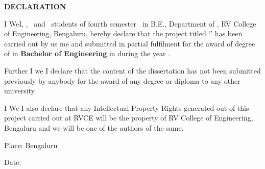 
\thispagestyle{empty}

\begin{center}
\Large\textbf{\underline{DECLARATION}} \par
\end{center}


\noindent \ifPG I \else \ifStuNameBUsed We\else I\fi\fi, \textbf{\printStuNameA} \ifPG \else\ifStuNameBUsed , \textbf{\printStuNameB}$\,$ \ifStuNameCUsed and \textbf{\printStuNameC}$\,$ \fi \fi \fi students of \ifPG fourth \else {}\fi \fi semester \ifPG \printMastersInSF\, in \printMastersPrgName \else B.E.\fi, Department of \printDepartmentLF, RV College of Engineering, Bengaluru, hereby declare that the \fi project titled `\textbf{\printTitle}' has been carried out by \ifStuNameBUsed us \else me \fi and submitted in partial fulfilment for the award of degree of \ifPG \textbf{\printMastersInLF} in \textbf{\printMastersPrgName} \else\textbf{Bachelor of Engineering} in \textbf{\printDepartmentLF} \fi during the year \printAcadYear.\\ \par

\noindent Further \ifPG I \else\ifStuNameBUsed we \else I \fi \fi declare that the content of the dissertation has not been submitted previously by anybody for the award of any degree or diploma to any other university.\\ \par

\noindent \ifPG I \else\ifStuNameBUsed We \else I \fi \fi also declare that any Intellectual Property Rights generated out of this project carried out at RVCE will be the property of RV College of Engineering, Bengaluru and we will be one of the authors of the same.

\vspace{1cm}
\noindent Place: Bengaluru\par
\vspace{0.5cm}
\noindent Date: \par


